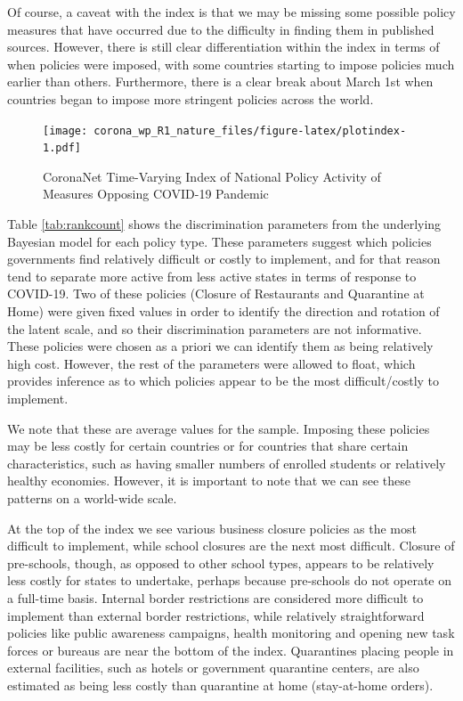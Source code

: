 \documentclass[]{article}
\begin{document}
Of course, a caveat with the index is that we may be missing some possible policy measures that have occurred due to the difficulty in finding them in published sources. However, there is still clear differentiation within the index in terms of when policies were imposed, with some countries starting to impose policies much earlier than others. Furthermore, there is a clear break about March 1st when countries began to impose more stringent policies across the world.

\begin{figure}
\centering
\texttt{[image: corona\_wp\_R1\_nature\_files/figure-latex/plotindex-1.pdf]}
\caption{\label{fig:plotindex}CoronaNet Time-Varying Index of National Policy Activity of Measures Opposing COVID-19 Pandemic}
\end{figure}

Table \ref{tab:rankcount} shows the discrimination parameters from the underlying Bayesian model for each policy type. These parameters suggest which policies governments find relatively difficult or costly to implement, and for that reason tend to separate more active from less active states in terms of response to COVID-19. Two of these policies (Closure of Restaurants and Quarantine at Home) were given fixed values in order to identify the direction and rotation of the latent scale, and so their discrimination parameters are not informative. These policies were chosen as a priori we can identify them as being relatively high cost. However, the rest of the parameters were allowed to float, which provides inference as to which policies appear to be the most difficult/costly to implement.

We note that these are average values for the sample. Imposing these policies may be less costly for certain countries or for countries that share certain characteristics, such as having smaller numbers of enrolled students or relatively healthy economies. However, it is important to note that we can see these patterns on a world-wide scale.

At the top of the index we see various business closure policies as the most difficult to implement, while school closures are the next most difficult. Closure of pre-schools, though, as opposed to other school types, appears to be relatively less costly for states to undertake, perhaps because pre-schools do not operate on a full-time basis. Internal border restrictions are considered more difficult to implement than external border restrictions, while relatively straightforward policies like public awareness campaigns, health monitoring and opening new task forces or bureaus are near the bottom of the index. Quarantines placing people in external facilities, such as hotels or government quarantine centers, are also estimated as being less costly than quarantine at home (stay-at-home orders).
\end{document}
